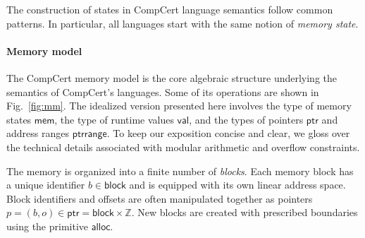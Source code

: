 \documentclass[acmsmall,authordraft]{acmart}
\newcommand{\kw}[1]{\ensuremath{ \mathsf{#1} }}
\begin{document}
%

The construction of states in CompCert language semantics
follow common patterns.
In particular,
all languages start with
the same notion of \emph{memory state}.


\paragraph{Memory model} \label{sec:sem:mm} %

The CompCert memory model \cite{compcertmm,compcertmmv2}
is the core algebraic structure
underlying the semantics of CompCert's languages.
Some of its operations
are shown in Fig.~\ref{fig:mm}.
The idealized version presented here
involves
the type of memory states \kw{mem},
the type of runtime values \kw{val}, and
the types of pointers \kw{ptr} and address ranges \kw{ptrrange}.
To keep our exposition concise and clear,
we gloss over the technical details
associated with modular arithmetic and overflow constraints.

The memory is organized into a finite number of \emph{blocks}.
Each memory block has a unique identifier $b \in \kw{block}$
and is equipped with its own linear address space.
Block identifiers and offsets are often manipulated together
as pointers $p = (b, o) \in \kw{ptr} = \kw{block} \times \mathbb{Z}$.
New blocks are created with prescribed boundaries
using the primitive $\kw{alloc}$.
\end{document}

